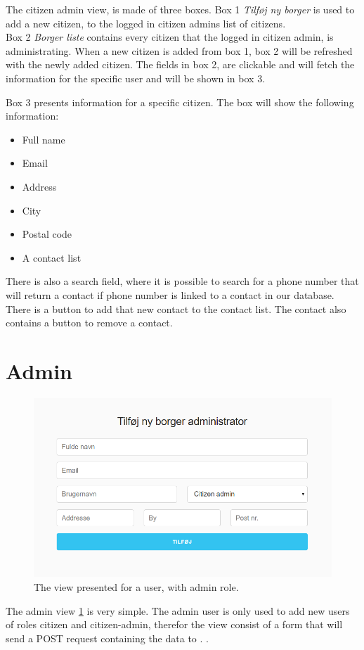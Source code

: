 The citizen admin view, is made of three boxes. Box 1 \textit{Tilføj ny borger} is used to add a new citizen, to the logged in citizen admins list of citizens.\\
Box 2 \textit{Borger liste} contains every citizen that the logged in citizen admin, is administrating. When a new citizen is added from box 1, box 2 will be refreshed with the newly added citizen. The fields in box 2, are clickable and will fetch the information for the specific user and will be shown in box 3.

Box 3 presents information for a specific citizen. The box will show the following information:
\begin{itemize}
    \item Full name
    \item Email
    \item Address
    \item City
    \item Postal code
    \item A contact list
\end{itemize}

There is also a search field, where it is possible to search for a phone number that will return a contact if phone number is linked to a contact in our database. There is a button to add that new contact to the contact list. The contact also contains a button to remove a contact. 



\section{Admin}
\begin{figure}[H]
    \centering
    \includegraphics[scale=0.5]{Figures/ControlPanel/AdminView.png}
    \caption{The view presented for a user, with admin role.}
    \label{fig:controlPanelAdminView}
\end{figure}

The admin view \ref{fig:controlPanelAdminView} is very simple. The admin user is only used to add new users of roles citizen and citizen-admin, therefor the view consist of a form that will send a POST request containing the data to . .